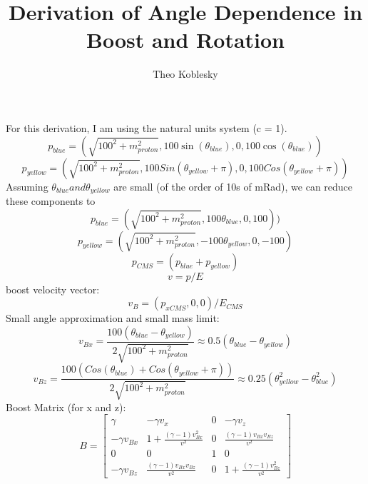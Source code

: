 \documentclass[12pt,oneside,openary]{article}
\begin{document}
\title{Derivation of Angle Dependence in Boost and Rotation}
\author{Theo Koblesky}
\maketitle

For this derivation, I am using the natural units system (c = 1).
\begin{equation}
p_{blue} = (\sqrt{100^2+m_{proton}^2},100\sin(\theta_{blue}),0,100\cos(\theta_{blue})) 
\end{equation}
\begin{equation}
p_{yellow} = (\sqrt{100^2+m_{proton}^2},100Sin(\theta_{yellow}+\pi),0,100Cos(\theta_{yellow}+\pi)) 
\end{equation}
Assuming $\theta_{blue} and \theta_{yellow}$ are small (of the order of 10s of mRad), we can reduce these components to
\begin{equation}
p_{blue} = (\sqrt{100^2+m_{proton}^2},100\theta_{blue},0,100)) 
\end{equation}
\begin{equation}
p_{yellow} = (\sqrt{100^2+m_{proton}^2},-100\theta_{yellow},0,-100) 
\end{equation}
\begin{equation}
p_{CMS} = (p_{blue}+p_{yellow})
\end{equation}
\begin{equation}
v = p/E
\end{equation}
boost velocity vector:
\begin{equation}
v_{B} = (p_{xCMS},0,0)/E_{CMS}
\end{equation}
Small angle approximation and small mass limit:
\begin{equation}
v_{Bx}  = \frac{100(\theta_{blue}-\theta_{yellow})}{2\sqrt{100^2+m_{proton}^2}}\approx 0.5(\theta_{blue}-\theta_{yellow})
\end{equation}
\begin{equation}
v_{Bz} = \frac{100(Cos(\theta_{blue})+Cos(\theta_{yellow}+\pi))}{2\sqrt{100^2+m_{proton}^2}}\approx 0.25(\theta_{yellow}^2-\theta_{blue}^2)
\end{equation}
Boost Matrix (for x and z):
\[
B=
\begin{bmatrix}
    \gamma & -\gamma v_{x} & 0  &-\gamma v_{z} \\
    -\gamma v_{Bx} & 1+\frac{(\gamma-1)v_{Bx}^2}{v^2} & 0  & \frac{(\gamma-1)v_{Bx}v_{Bz}}{v^2} \\
    0 & 0 & 1 & 0 \\
    -\gamma v_{Bz} & \frac{(\gamma-1)v_{Bx}v_{Bz}}{v^2} & 0  & 1+\frac{(\gamma-1)v_{Bz}^2}{v^2}
\end{bmatrix}
\]
\end{document}
